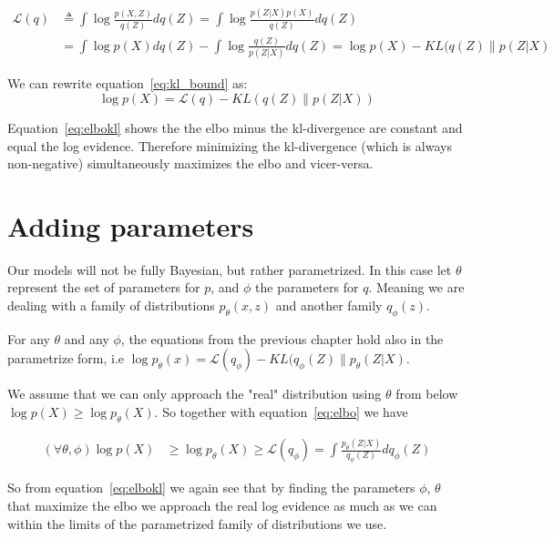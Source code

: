 \documentclass[11pt, a4paper]{report}
\theoremstyle{plain}
\theoremstyle{definition}
\theoremstyle{remark}
\begin{document}
\begin{equation}\label{eq:kl_bound}
\begin{aligned}
\mathcal{L}(q) &\triangleq \int \log \frac{p(X,Z)}{q(Z)} d q(Z)
= \int \log \frac{p(Z|X)p(X)}{q(Z)} d q(Z) \\
&= \int \log p(X) dq(Z) - \int \log \frac{q(Z)}{p(Z|X)} dq(Z) 
= \log p(X) - KL(q(Z) \| p(Z|X)
\end{aligned}
\end{equation}

We can rewrite equation~\ref{eq:kl_bound} as:
\begin{equation}\label{eq:elbokl}
\log p(X) = \mathcal{L}(q) - KL(q(Z) \| p(Z|X))
\end{equation}

Equation~\ref{eq:elbokl} shows the the elbo minus the kl-divergence are constant
and equal the log evidence. Therefore minimizing the kl-divergence (which is
always non-negative) simultaneously maximizes the elbo and vicer-versa.

\section{Adding parameters}

Our models will not be fully Bayesian, but rather parametrized.
In this case let $\theta$ represent the set of parameters for $p$, and $\phi$
the parameters for $q$. Meaning we are dealing with a family of distributions
$p_{\theta}(x,z)$ and another family $q_{\phi}(z)$.

For any $\theta$ and any $\phi$, the equations from the previous chapter hold
also in the parametrize form, i.e $\log p_{\theta}(x) = \mathcal{L}(q_{\phi}) -
KL(q_{\phi}(Z) \| p_{\theta}(Z|X)$.

We assume that we can only approach the "real" distribution using
$\theta$ from below $\log p(X) \geq \log p_{\theta}(X)$.
So together with equation~\ref{eq:elbo} we have

\begin{equation}\label{eq:parelbo}
\begin{aligned}
(\forall \theta, \phi)\log p(X) & \geq \log p_{\theta}(X) \geq \mathcal{L}(q_{\phi})
= \int \frac{p_{\theta}(Z|X)}{q_{\phi}(Z)} dq_{\phi}(Z)
\end{aligned}
\end{equation}

So from equation~\ref{eq:elbokl} we again see that by finding the parameters
$\phi$, $\theta$ that maximize the elbo we approach the real log evidence as much
as we can within the limits of the parametrized family of distributions we use.
\end{document}
